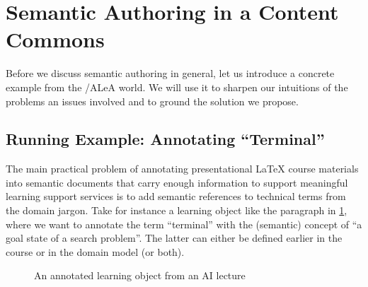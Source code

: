 \documentclass{llncs}
\newcommand\ALeA{\textsf{ALeA}\xspace}
\begin{document}
\section{Semantic Authoring in a Content Commons}

Before we discuss semantic authoring in general, let us introduce a concrete example from
the \sTeX/\ALeA world. We will use it to sharpen our intuitions of the problems an issues
involved and to ground the solution we propose.

\subsection{Running Example: Annotating  ``Terminal''}
The main practical problem of annotating presentational {\LaTeX} course materials into
semantic documents that carry enough information to support meaningful learning support
services is to add semantic references to technical terms from the domain jargon.
Take for instance a learning object like the paragraph in \cref{fig:lo}, where we want to annotate
the term ``terminal'' with the (semantic) concept of ``a goal state of a search
problem''. The latter can either be defined earlier in the course or in the domain model
(or both).



\begin{figure}[ht]\centering
  \caption{An annotated learning object from an AI lecture}\label{fig:lo}
\end{figure}
\end{document}
